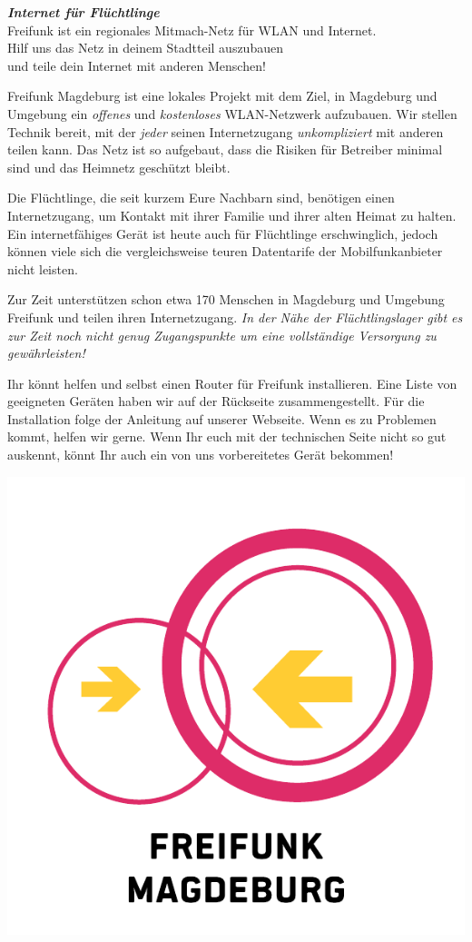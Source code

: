 \documentclass[a4paper]{article}
\begin{document}
\thispagestyle{empty}
 
\begin{center}
\Huge \textit{\textbf{\textcolor{freifunkpink}{Internet für Flüchtlinge}}} \\
\vspace{0.6cm}
\large Freifunk ist ein regionales Mitmach-Netz für WLAN und Internet.\\
Hilf uns das Netz in deinem Stadtteil auszubauen \\
und teile dein Internet mit anderen Menschen!
\normalsize

\vspace{1.0cm}
\end{center}

{ }
\vspace{0.5cm}

Freifunk Magdeburg ist eine lokales Projekt mit dem Ziel, in Magdeburg und Umgebung ein \emph{offenes} und \emph{kostenloses} WLAN-Netzwerk aufzubauen. Wir stellen Technik bereit, mit der \emph{jeder} seinen Internetzugang \emph{unkompliziert} mit anderen teilen kann. Das Netz ist so aufgebaut, dass die Risiken für Betreiber minimal sind und das Heimnetz geschützt bleibt.

Die Flüchtlinge, die seit kurzem Eure Nachbarn sind, benötigen einen Internetzugang, um Kontakt mit ihrer Familie und ihrer alten Heimat zu halten. Ein internetfähiges Gerät ist heute auch für Flüchtlinge erschwinglich, jedoch können viele sich die vergleichsweise teuren Datentarife der Mobilfunkanbieter nicht leisten.

Zur Zeit unterstützen schon etwa 170 Menschen in Magdeburg und Umgebung Freifunk und teilen ihren Internetzugang. \emph{In der Nähe der Flüchtlingslager gibt es zur Zeit noch nicht genug Zugangspunkte um eine vollständige Versorgung zu gewährleisten!}

Ihr könnt helfen und selbst einen Router für Freifunk installieren. Eine Liste von geeigneten Geräten haben wir auf der Rückseite zusammengestellt. Für die Installation folge der Anleitung auf unserer Webseite. Wenn es zu Problemen kommt, helfen wir gerne.
Wenn Ihr euch mit der technischen Seite nicht so gut auskennt, könnt Ihr auch ein von uns vorbereitetes Gerät bekommen!

\vspace{0.4cm}

\begin{center}
\includegraphics[width=120 px]{freifunk-md-logo}
\end{center}
\end{document}
